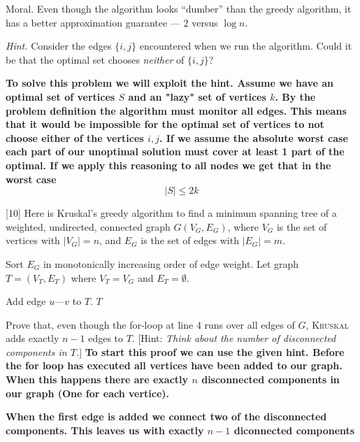 \documentclass[addpoints]{exam}
\def\mysolution#1{}    %
\begin{document}
\begin{questions}
\begin{parts}
{\sc Moral.}  Even though the algorithm looks ``dumber'' than the greedy algorithm, it has a better approximation guarantee --- $2$ versus $\log n$.
\end{parts}

{\em Hint.} Consider the edges $\{i,j\}$ encountered when we run the algorithm. Could it be that the optimal set chooses {\em neither} of $\{i,j\}$?

\textbf{To solve this problem we will exploit the hint. Assume we have an optimal set of vertices $S$ and an "lazy" set of vertices $k$. By the problem definition the algorithm must monitor all edges. This means that it would be impossible for the optimal set of vertices to not choose either of the vertices ${i,j}$. If we assume the absolute worst case each part of our unoptimal solution must cover at least 1 part of the optimal. If we apply this reasoning to all nodes we get that in the worst case}
\[|S| \le 2k\]
\mysolution{

}

[10]
Here is Kruskal's greedy algorithm to find a minimum spanning tree of a weighted, undirected, connected graph $G(V_G,E_G)$, where $V_G$ is the set of vertices with $|V_G|=n$, and $E_G$ is the set of edges with $|E_G|=m$.
\begin{algorithmic}[1]
    \State Sort $E_G$ in monotonically increasing order of edge weight.
    \State Let graph $T=(V_T,E_T)$ where $V_T=V_G$ and $E_T=\emptyset$.
    
            \State Add edge $u$---$v$ to $T$.
        \EndIf
    \EndFor
    \State \Return $T$
    \EndFunction
\end{algorithmic}

Prove that, even though the for-loop at line 4 runs over all edges of $G$, \textsc{Kruskal} adds exactly $n-1$ edges to $T$. [Hint: \textit{Think about the number of disconnected components in $T$.}]
\textbf{To start this proof we can use the given hint. Before the for loop has executed all vertices have been added to our graph. When this happens there are exactly $n$ disconnected components in our graph (One for each vertice).}

\textbf{When the first edge is added we connect two of the disconnected components. This leaves us with exactly $n-1$ diconnected components}


\end{questions}
\end{document}
